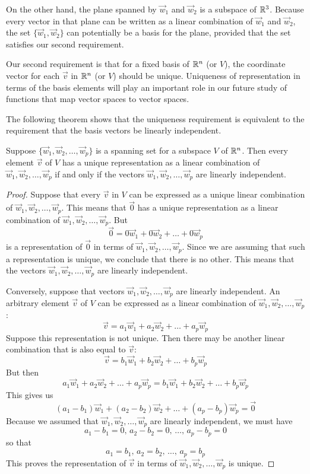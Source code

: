 \documentclass{ximera}
\begin{document}
On the other hand, the plane spanned by $\vec{w}_1$ and $\vec{w}_2$ is a subspace of $\mathbb{R}^3$.  Because every vector in that plane can be written as a linear combination of $\vec{w}_1$ and $\vec{w}_2$, the set $\{\vec{w}_1, \vec{w}_2\}$ can potentially be a basis for the plane, provided that the set satisfies our second requirement.

Our second requirement is that for a fixed basis of $\mathbb{R}^n$ (or $V$), the coordinate vector for each $\vec{v}$ in $\mathbb{R}^n$ (or $V$) should be unique.  Uniqueness of representation in terms of the basis elements will play an important role in our future study of functions that map vector spaces to vector spaces.

The following theorem shows that the uniqueness requirement is equivalent to the requirement that the basis vectors be linearly independent.  %

\begin{theorem}\label{th:linindbasis}
Suppose $\{\vec{w}_1, \vec{w}_2,\ldots,\vec{w}_p\}$ is a spanning set for a subspace $V$ of $\mathbb{R}^n$.  Then every element $\vec{v}$ of $V$ has a unique representation as a linear combination of  $\vec{w}_1, \vec{w}_2,\ldots,\vec{w}_p$ if and only if the vectors $\vec{w}_1, \vec{w}_2,\ldots,\vec{w}_p$ are linearly independent.
\end{theorem}
\begin{proof}
Suppose that every $\vec{v}$ in $V$ can be expressed as a unique linear combination of $\vec{w}_1, \vec{w}_2,\ldots,\vec{w}_p$.
This means that $\vec{0}$ has a unique representation as a linear combination of $\vec{w}_1, \vec{w}_2,\ldots,\vec{w}_p$.
But 
$$\vec{0}=0\vec{w}_1+0\vec{w}_2+\ldots+0\vec{w}_p$$
is a representation of $\vec{0}$ in terms of $\vec{w}_1, \vec{w}_2,\ldots,\vec{w}_p$.  Since we are assuming that such a representation is unique, we conclude that there is no other.  This means that the vectors $\vec{w}_1, \vec{w}_2,\ldots,\vec{w}_p$ are linearly independent.

Conversely, suppose that vectors $\vec{w}_1, \vec{w}_2,\ldots,\vec{w}_p$ are linearly independent.  An arbitrary element $\vec{v}$ of $V$ can be expressed as a linear combination of $\vec{w}_1, \vec{w}_2,\ldots,\vec{w}_p$:
$$\vec{v}=a_1\vec{w}_1+a_2\vec{w}_2+\ldots+a_p\vec{w}_p$$
Suppose this representation is not unique.  Then there may be another linear combination that is also equal to $\vec{v}$:
$$\vec{v}=b_1\vec{w}_1+b_2\vec{w}_2+\ldots+b_p\vec{w}_p$$
But then
$$a_1\vec{w}_1+a_2\vec{w}_2+\ldots+a_p\vec{w}_p=b_1\vec{w}_1+b_2\vec{w}_2+\ldots+b_p\vec{w}_p$$
This gives us
$$(a_1-b_1)\vec{w}_1+(a_2-b_2)\vec{w}_2+\ldots+(a_p-b_p)\vec{w}_p=\vec{0}$$
Because we assumed that $\vec{w}_1, \vec{w}_2,\ldots,\vec{w}_p$ are linearly independent, we must have
$$a_1-b_1=0,\, a_2-b_2=0,\,\ldots ,\,a_p-b_p=0$$
so that
$$a_1=b_1,\, a_2=b_2,\,\ldots ,\,a_p=b_p$$
This proves the representation of $\vec{v}$ in terms of $\vec{w}_1, \vec{w}_2,\ldots,\vec{w}_p$ is unique.

\end{proof}
\end{document}
